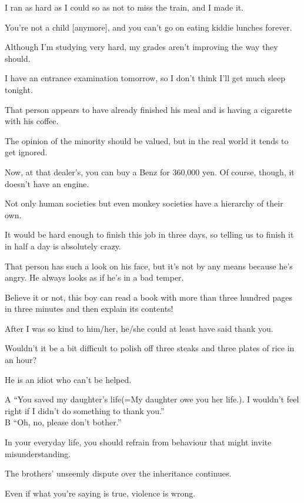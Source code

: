 \item[121.] I ran as hard as I could so as not to miss the train, and I made it.
\item[122.] You're not a child [anymore], and you can't go on eating kiddie lunches forever.
\item[123.] Although I'm studying very hard, my grades aren't improving the way they should.
\item[124.] I have an entrance examination tomorrow, so I don't think I'll get much sleep tonight.
\item[125.] That person appears to have already finished his meal and is having a cigarette with his coffee.
\item[126.] The opinion of the minority should be valued, but in the real world it tends to get ignored.
\item[127.] Now, at that dealer's, you can buy a Benz for 360,000 yen.  Of course, though, it doesn't have an engine.
\item[128.] Not only human societies but even monkey societies have a hierarchy of their own.
\item[129.] It would be hard enough to finish this job in three days, so telling us to finish it in half a day is absolutely crazy.
\item[130.] That person has such a look on his face, but it's not by any means because he's angry.  He always looks as if he's in a bad temper.
\item[131.] Believe it or not, this boy can read a book with more than three hundred pages in three minutes and then explain its contents!
\item[132.] After I was so kind to him/her, he/she could at least have said thank you.
\item[133.] Wouldn't it be a bit difficult to polish off three steaks and three plates of rice in an hour?
\item[134.] He is an idiot who can't be helped.
\item[135.] A ``You saved my daughter's life(=My daughter owe you her life.). I wouldn't feel right if I didn't do something to thank you.''\\B ``Oh, no, please don't bother.''
\item[136.] In your everyday life, you should refrain from behaviour that might invite misunderstanding.
\item[137.] The brothers' unseemly dispute over the inheritance continues.
\item[138.] Even if what you're saying is true, violence is wrong.
